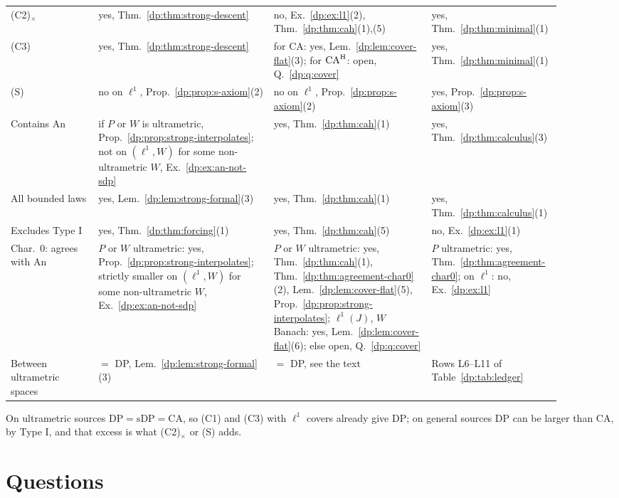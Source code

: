 \documentclass[11pt]{amsart}
\theoremstyle{definition}
\theoremstyle{remark}
\numberwithin{equation}{section}
\theoremstyle{plain}
\theoremstyle{definition}
\theoremstyle{plain}
\begin{document}
\begin{table}[htbp]
\begin{tabular}{@{}p{0.15\linewidth}p{0.3\linewidth}p{0.27\linewidth}p{0.18\linewidth}@{}}
(C2)$_\times$ & yes, Thm.~\ref{dp:thm:strong-descent} & no, Ex.~\ref{dp:ex:l1}(2), Thm.~\ref{dp:thm:cah}(1),(5) & yes, Thm.~\ref{dp:thm:minimal}(1)\\
(C3) & yes, Thm.~\ref{dp:thm:strong-descent} & for CA: yes, Lem.~\ref{dp:lem:cover-flat}(3); for $\mathrm{CA}^{\rm H}$: open, Q.~\ref{dp:q:cover} & yes, Thm.~\ref{dp:thm:minimal}(1)\\
(S) & no on $\ell^1$, Prop.~\ref{dp:prop:s-axiom}(2) & no on $\ell^1$, Prop.~\ref{dp:prop:s-axiom}(2) & yes, Prop.~\ref{dp:prop:s-axiom}(3)\\
Contains An & if $P$ or $W$ is ultrametric, Prop.~\ref{dp:prop:strong-interpolates}; not on $(\ell^1,W)$ for some non-ultrametric $W$, Ex.~\ref{dp:ex:an-not-sdp} & yes, Thm.~\ref{dp:thm:cah}(1) & yes, Thm.~\ref{dp:thm:calculus}(3)\\
All bounded laws & yes, Lem.~\ref{dp:lem:strong-formal}(3) & yes, Thm.~\ref{dp:thm:cah}(1) & yes, Thm.~\ref{dp:thm:calculus}(1)\\
Excludes Type I & yes, Thm.~\ref{dp:thm:forcing}(1) & yes, Thm.~\ref{dp:thm:cah}(5) & no, Ex.~\ref{dp:ex:l1}(1)\\
Char.\ $0$: agrees with An & $P$ or $W$ ultrametric: yes, Prop.~\ref{dp:prop:strong-interpolates}; strictly smaller on $(\ell^1,W)$ for some non-ultrametric $W$, Ex.~\ref{dp:ex:an-not-sdp} & $P$ or $W$ ultrametric: yes, Thm.~\ref{dp:thm:cah}(1), Thm.~\ref{dp:thm:agreement-char0}(2), Lem.~\ref{dp:lem:cover-flat}(5), Prop.~\ref{dp:prop:strong-interpolates}; $\ell^1(J)$, $W$ Banach: yes, Lem.~\ref{dp:lem:cover-flat}(6); else open, Q.~\ref{dp:q:cover} & $P$ ultrametric: yes, Thm.~\ref{dp:thm:agreement-char0}; on $\ell^1$: no, Ex.~\ref{dp:ex:l1}\\
Between ultrametric spaces & $=$ DP, Lem.~\ref{dp:lem:strong-formal}(3) & $=$ DP, see the text & Rows L6--L11 of Table~\ref{dp:tab:ledger}\\
\end{tabular}
\end{table}

On ultrametric sources $\mathrm{DP}=\mathrm{sDP}=\mathrm{CA}$, so (C1) and (C3) with $\ell^1$ covers already give DP; on general sources DP can be larger than CA, by Type I, and that excess is what (C2)$_\times$ or (S) adds.
\section{Questions}\label{dp:sec:questions}
\end{document}
